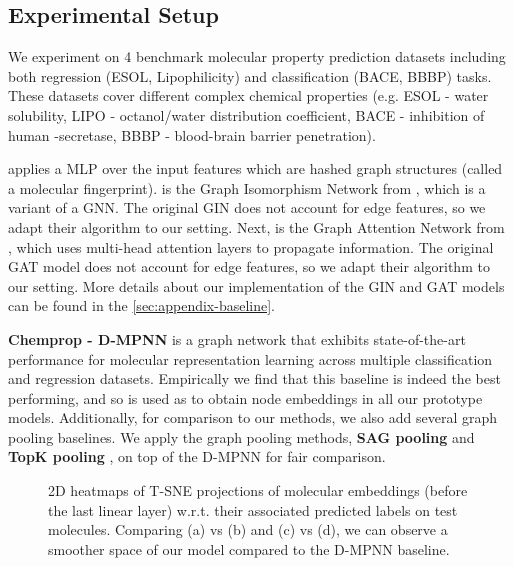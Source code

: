 \documentclass[letterpaper]{article} \usepackage{aaai22}  \usepackage{times}  \usepackage{helvet}  \usepackage{courier}  \usepackage[hyphens]{url}  \usepackage{graphicx} \urlstyle{rm} \def\UrlFont{\rm}  \usepackage{natbib}  \usepackage{caption} \DeclareCaptionStyle{ruled}{labelfont=normalfont,labelsep=colon,strut=off} \frenchspacing  \setlength{\pdfpagewidth}{8.5in}  \setlength{\pdfpageheight}{11in}  \usepackage{algorithm}
\begin{document}
\subsection{Experimental Setup}
We experiment on 4 benchmark molecular property prediction datasets \citep{yang2019analyzing} including both regression (ESOL, Lipophilicity) and classification (BACE, BBBP) tasks. These datasets cover different complex chemical properties (e.g. ESOL - water solubility, LIPO - octanol/water distribution coefficient, BACE - inhibition of human -secretase, BBBP - blood-brain barrier penetration). 

\noindent\textbf{} applies a MLP over the input features which are hashed graph structures (called a molecular fingerprint). \textbf{} is the Graph Isomorphism Network from \citep{xu2018powerful}, which is a variant of a GNN. The original GIN does not account for edge features, so we adapt their algorithm to our setting. Next, \textbf{} is the Graph Attention Network from \citep{velivckovic2017graph}, which uses multi-head attention layers to propagate information. The original GAT model does not account for edge features, so we adapt their algorithm to our setting. More details about our implementation of the GIN and GAT models can be found in the \cref{sec:appendix-baseline}. 

\textbf{Chemprop - D-MPNN} \citep{yang2019analyzing} is a graph network that exhibits state-of-the-art performance for molecular representation learning across multiple classification and regression datasets. Empirically we find that this baseline is indeed the best performing, and so is used as to obtain node embeddings in all our prototype models. Additionally, for comparison to our methods, we also add several graph pooling baselines. We apply the graph pooling methods, \textbf{SAG pooling} \citep{lee2019self} and \textbf{TopK pooling} \citep{gao2019graph}, on top of the D-MPNN for fair comparison. 

\begin{figure}[t]
    \centering
  \caption{2D heatmaps of T-SNE projections of molecular embeddings (before the last linear layer) w.r.t. their associated predicted labels on test molecules. Comparing (a) vs (b) and (c) vs (d), we can observe a smoother space of our model compared to the D-MPNN baseline.  \vspace{-0.3cm}}
    \label{fig:embedding_space}
\end{figure}
\end{document}
